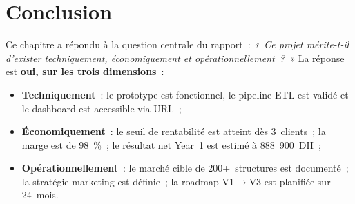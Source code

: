 \documentclass[12pt, a4paper]{report}
\begin{document}
\section{Conclusion}

Ce chapitre a répondu à la question centrale du rapport~:
\textit{«~Ce projet mérite-t-il d'exister techniquement, économiquement et
opérationnellement~?~»} La réponse est \textbf{oui, sur les trois dimensions}~:

\begin{itemize}[leftmargin=1.5em]
  \item \textbf{Techniquement}~: le prototype est fonctionnel, le pipeline ETL
    est validé et le dashboard est accessible via URL~;
  \item \textbf{Économiquement}~: le seuil de rentabilité est atteint dès
    3~clients~; la marge est de 98~\%~; le résultat net Year~1 est estimé à
    888~900~DH~;
  \item \textbf{Opérationnellement}~: le marché cible de 200+~structures est
    documenté~; la stratégie marketing est définie~; la roadmap V1$\to$V3 est
    planifiée sur 24~mois.
\end{itemize}
\end{document}
